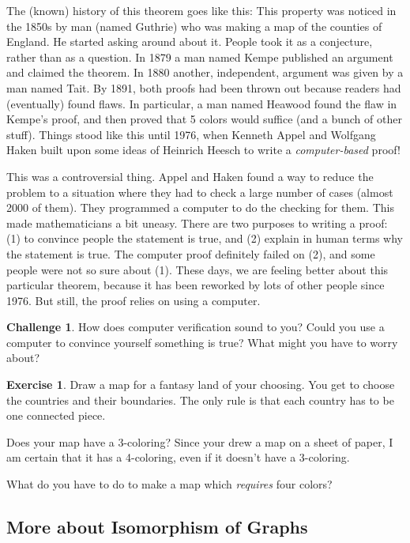 \documentclass[12pt,letterpaper]{article}
\theoremstyle{definition}
\newtheorem{exercise}[question]{Exercise}
\newtheorem*{challenge}{Challenge}
\begin{document}
The (known) history of this theorem goes like this: This property was noticed in the 1850s by man (named Guthrie)
who was making a map of the counties of England. He started asking around about it. People took it as a conjecture, 
rather than as a question. In 1879 a man named Kempe published an argument and claimed the theorem. In 1880
another, independent, argument was given by a man named Tait.  By 1891, both proofs had been thrown out
because readers had (eventually) found flaws. In particular, a man named Heawood found the flaw in Kempe's proof, 
and then proved that 5 colors would suffice (and a bunch of other stuff). Things stood like this until 1976, when
Kenneth Appel and Wolfgang Haken built upon some ideas of Heinrich Heesch to write a \emph{computer-based}
proof!

This was a controversial thing. Appel and Haken found a way to reduce the problem to a situation where they had 
to check a large number of cases (almost 2000 of them). They programmed a computer to do the checking for them.
This made mathematicians a bit uneasy. There are two purposes to writing a proof: (1) to convince people the
statement is true, and (2) explain in human terms why the statement is true. The computer proof definitely failed
on (2), and some people were not so sure about (1).  These days, we are feeling better about this particular theorem,
because it has been reworked by lots of other people since 1976. But still, the proof relies on using a computer.

\begin{challenge}
How does computer verification sound to you? Could you use a computer to convince yourself something is true?
What might you have to worry about? 
\end{challenge}

\begin{exercise}
Draw a map for a fantasy land of your choosing. You get to choose the countries and their boundaries. The only rule
is that each country has to be one connected piece.

Does your map have a 3-coloring? Since your drew a map on a sheet of paper, I am certain that it has a 4-coloring, 
even if it doesn't have a 3-coloring.

What do you have to do to make a map which \emph{requires} four colors?
\end{exercise}

\clearpage
\subsection*{More about Isomorphism of Graphs}
\end{document}

